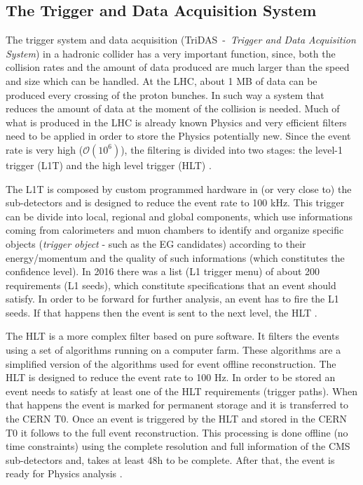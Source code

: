 \subsection{The Trigger and Data Acquisition System}
The trigger system and data acquisition (TriDAS~-~\textit{Trigger and Data Acquisition System}) in a hadronic collider has a very important function, since, both the collision rates and the amount of data produced are much larger than the speed and size which can be handled. At the LHC, about 1 MB of data can be produced every crossing of the proton bunches. In such way a system that reduces the amount of data at the moment of the collision is needed. Much of what is produced in the LHC is already known Physics and very efficient filters need to be applied in order to store the Physics potentially new. Since the event rate is very high ($\mathcal{O}(10^{6})$), the filtering is divided into two stages: the level-1 trigger (L1T) and the high level trigger (HLT) \cite{bib:JINST-3-362-2008,bib:CMS-DAS-TDR-2002}. 

The L1T is composed by custom programmed hardware in (or very close to) the sub-detectors and is designed to reduce the event rate to 100 kHz. This trigger can be divide into local, regional and global components, which use informations coming from calorimeters and muon chambers to identify and organize specific objects (\textit{trigger object} - such as the EG candidates) according to their energy/momentum and the quality of such informations (which constitutes the confidence level). In 2016 there was a list (L1 trigger menu) of about 200 requirements (L1 seeds), which constitute specifications that an event should satisfy. In order to be forward for further analysis, an event has to fire the L1 seeds. If that happens then the event is sent to the next level, the HLT \cite{bib:JINST-3-362-2008,bib:CMS-DAS-TDR-2002}.

The HLT is a more complex filter based on pure software. It filters the events using a set of algorithms running on a computer farm. These algorithms are a simplified version of the algorithms used for event offline reconstruction. The HLT is designed to reduce the event rate to 100 Hz. In order to be stored an event needs to satisfy at least one of the HLT requirements (trigger paths). When that happens the event is marked for permanent storage and it is transferred to the CERN T0. Once an event is triggered by the HLT and stored in the CERN T0 it follows to the full event reconstruction. This processing is done offline (no time constraints) using the complete resolution and full information of the CMS sub-detectors and, takes at least 48h to be complete. After that, the event is ready for Physics analysis \cite{bib:JINST-3-362-2008,bib:CMS-DAS-TDR-2002}.